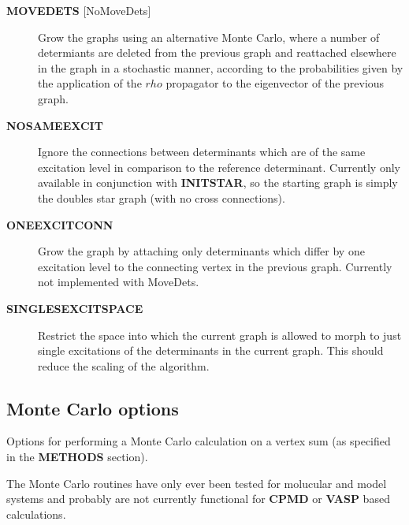\documentclass[openany,a4paper,10pt,english]{manual}
\begin{document}
\begin{description}
\item[\textbf{MOVEDETS} {[}NoMoveDets{]}] \leavevmode
Grow the graphs using an alternative Monte Carlo, where a number
of determiants are deleted from the previous graph and reattached
elsewhere in the graph in a stochastic manner, according to the
probabilities given by the application of the $rho$ propagator
to the eigenvector of the previous graph.

\item[\textbf{NOSAMEEXCIT}] \leavevmode
Ignore the connections between determinants which are of the
same excitation level in comparison to the reference determinant.
Currently only available in conjunction with \textbf{INITSTAR}, so the
starting graph is simply the doubles star graph (with no cross
connections).

\item[\textbf{ONEEXCITCONN}] \leavevmode
Grow the graph by attaching only determinants which differ by one
excitation level to the connecting vertex in the previous graph.
Currently not implemented with MoveDets.

\item[\textbf{SINGLESEXCITSPACE}] \leavevmode
Restrict the space into which the current graph is allowed to morph
to just single excitations of the determinants in the current graph.
This should reduce the scaling of the algorithm.

\end{description}


\subsection{Monte Carlo options}

Options for performing a Monte Carlo calculation on a vertex sum (as
specified in the \textbf{METHODS} section).

The Monte Carlo routines have only ever been tested for molucular and
model systems and probably are not currently functional for \textbf{CPMD}
or \textbf{VASP} based calculations.
\end{document}
